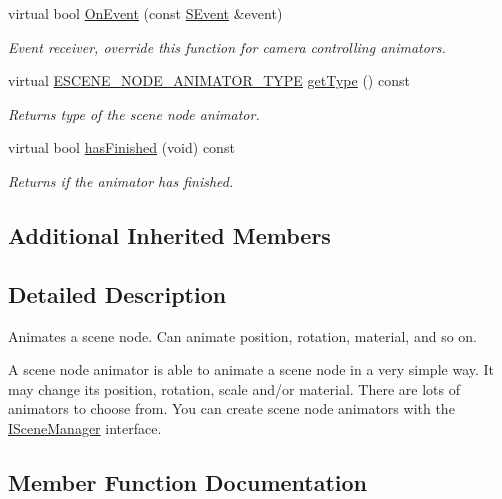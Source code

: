 \begin{DoxyCompactItemize}
virtual bool \hyperlink{classirr_1_1scene_1_1ISceneNodeAnimator_aca20b841bb586cd9654464b001a7b6aa}{On\+Event} (const \hyperlink{structirr_1_1SEvent}{S\+Event} \&event)
\begin{DoxyCompactList}\small\item\em Event receiver, override this function for camera controlling animators. \end{DoxyCompactList}\item 
\mbox{\label{classirr_1_1scene_1_1ISceneNodeAnimator_a8d00cd0bc44945c617c0b8fa5c6ddcd5}} 
virtual \hyperlink{namespaceirr_1_1scene_a327a1e43872705cf8f3f3342fb307d19}{E\+S\+C\+E\+N\+E\+\_\+\+N\+O\+D\+E\+\_\+\+A\+N\+I\+M\+A\+T\+O\+R\+\_\+\+T\+Y\+PE} \hyperlink{classirr_1_1scene_1_1ISceneNodeAnimator_a8d00cd0bc44945c617c0b8fa5c6ddcd5}{get\+Type} () const
\begin{DoxyCompactList}\small\item\em Returns type of the scene node animator. \end{DoxyCompactList}\item 
virtual bool \hyperlink{classirr_1_1scene_1_1ISceneNodeAnimator_a77fd626155079b11327f0bd775e85425}{has\+Finished} (void) const
\begin{DoxyCompactList}\small\item\em Returns if the animator has finished. \end{DoxyCompactList}\end{DoxyCompactItemize}
\subsection*{Additional Inherited Members}


\subsection{Detailed Description}
Animates a scene node. Can animate position, rotation, material, and so on. 

A scene node animator is able to animate a scene node in a very simple way. It may change its position, rotation, scale and/or material. There are lots of animators to choose from. You can create scene node animators with the \hyperlink{classirr_1_1scene_1_1ISceneManager}{I\+Scene\+Manager} interface. 

\subsection{Member Function Documentation}
\mbox{\label{classirr_1_1scene_1_1ISceneNodeAnimator_ab2170d133db16de148d0f6841c06bc84}} 
